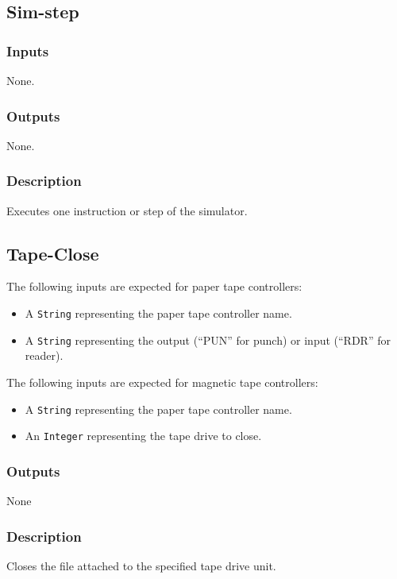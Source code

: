 \documentclass[10pt, openany]{book}
\newcommand{\datatype}[1]{\texttt{#1}}
\begin{document}
\subsection{Sim-step}
\subsubsection{Inputs}
None.
\subsubsection{Outputs}
None.
\subsubsection{Description}
Executes one instruction or step of the simulator.

\subsection{Tape-Close}
The following inputs are expected for paper tape controllers:
\begin{itemize}
  \item A \datatype{String} representing the paper tape controller name.
  \item A \datatype{String} representing the output (``PUN'' for punch) or input (``RDR'' for reader).
\end{itemize}
The following inputs are expected for magnetic tape controllers:
\begin{itemize}
  \item A \datatype{String} representing the paper tape controller name.
  \item An \datatype{Integer} representing the tape drive to close.
\end{itemize}
\subsubsection{Outputs}
None
\subsubsection{Description}
Closes the file attached to the specified tape drive unit.
\end{document}
